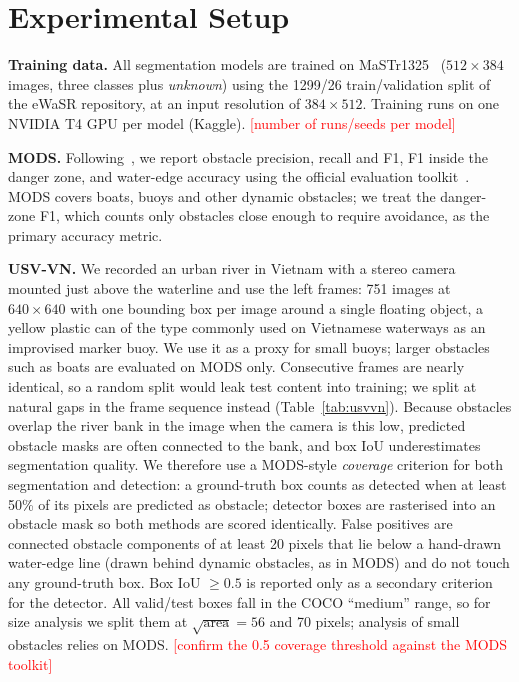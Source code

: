 \documentclass[conference]{IEEEtran}
\newcommand{\tbd}[1]{\textcolor{red}{[#1]}}
\begin{document}
\section{Experimental Setup}
\label{sec:data}
\textbf{Training data.} All segmentation models are trained on MaSTr1325~\cite{bovcon2019mastr} ($512\times384$ images, three classes plus \emph{unknown}) using the 1299/26 train/validation split of the eWaSR repository, at an input resolution of $384\times512$. Training runs on one NVIDIA T4 GPU per model (Kaggle). \tbd{number of runs/seeds per model}

\textbf{MODS.} Following~\cite{bovcon2022mods}, we report obstacle precision, recall and F1, F1 inside the danger zone, and water-edge accuracy using the official evaluation toolkit~\cite{mods_toolkit}. MODS covers boats, buoys and other dynamic obstacles; we treat the danger-zone F1, which counts only obstacles close enough to require avoidance, as the primary accuracy metric.

\textbf{USV-VN.} We recorded an urban river in Vietnam with a stereo camera mounted just above the waterline and use the left frames: 751 images at $640\times640$ with one bounding box per image around a single floating object, a yellow plastic can of the type commonly used on Vietnamese waterways as an improvised marker buoy. We use it as a proxy for small buoys; larger obstacles such as boats are evaluated on MODS only. Consecutive frames are nearly identical, so a random split would leak test content into training; we split at natural gaps in the frame sequence instead (Table~\ref{tab:usvvn}). Because obstacles overlap the river bank in the image when the camera is this low, predicted obstacle masks are often connected to the bank, and box IoU underestimates segmentation quality. We therefore use a MODS-style \emph{coverage} criterion for both segmentation and detection: a ground-truth box counts as detected when at least 50\% of its pixels are predicted as obstacle; detector boxes are rasterised into an obstacle mask so both methods are scored identically. False positives are connected obstacle components of at least 20 pixels that lie below a hand-drawn water-edge line (drawn behind dynamic obstacles, as in MODS) and do not touch any ground-truth box. Box IoU $\geq 0.5$ is reported only as a secondary criterion for the detector. All valid/test boxes fall in the COCO ``medium'' range, so for size analysis we split them at $\sqrt{\text{area}}=56$ and 70 pixels; analysis of small obstacles relies on MODS. \tbd{confirm the 0.5 coverage threshold against the MODS toolkit}
\end{document}
